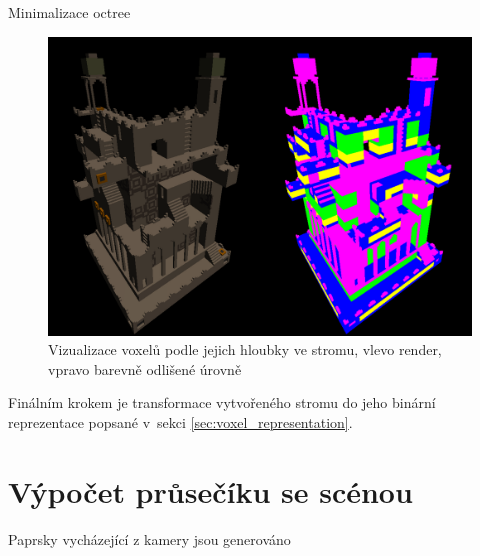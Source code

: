 \begin{center}
	\begin{czechalgorithm}[H] \label{alg:minimize_svo}


		\caption{Minimalizace octree}
	\end{czechalgorithm}
\end{center}

\begin{figure}[H]
	\centering
	\includegraphics[scale=0.7]{obrazky-figures/levels_render.png}
	\caption{Vizualizace voxelů podle jejich hloubky ve stromu, vlevo render, vpravo barevně odlišené úrovně}
	\label{fig:imgui_classes}
\end{figure}



Finálním krokem je transformace vytvořeného stromu do jeho binární reprezentace popsané v~sekci \ref{sec:voxel_representation}.


\section{Výpočet průsečíku se scénou} \label{sec:bvh_traversal_impl}
Paprsky vycházející z kamery jsou generováno 

